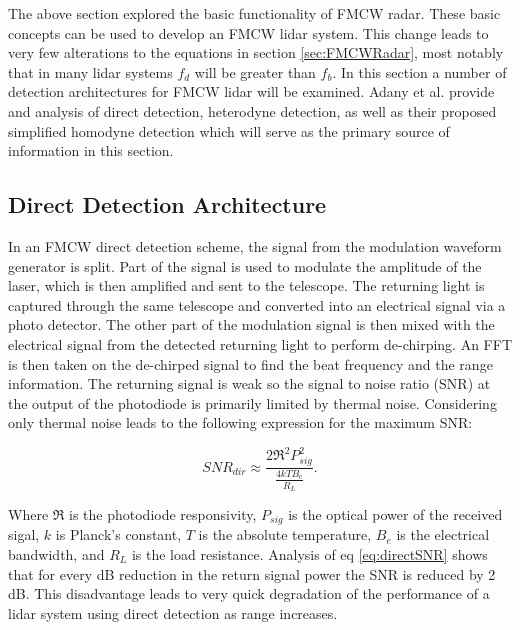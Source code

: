 The above section explored the basic functionality of FMCW radar. These basic concepts can be used
to develop an FMCW lidar system. This change leads to very few alterations to the equations in section
\ref{sec:FMCWRadar}, most notably that in many lidar systems $f_d$ will be greater than $f_b$. 
In this section a number of detection architectures for FMCW lidar will be examined. Adany et al. provide
and analysis of direct detection, heterodyne detection, as well as their proposed simplified homodyne 
detection \cite{adany09,adany2007simplified} which will serve as the primary source of information in this section. 

\subsection{Direct Detection Architecture}
In an FMCW direct detection scheme, the signal from the modulation waveform generator is split. Part of the signal
is used to modulate the amplitude of the laser, which is then amplified and sent to the telescope. The 
returning light is captured through the same telescope and converted into an electrical signal via a
photo detector. The other part of the modulation signal is then mixed with the electrical signal from the
detected returning light to perform de-chirping. An FFT is then taken on the de-chirped signal to find 
the beat frequency and the range information. The returning signal is weak so the signal to noise ratio (SNR)
at the output of the photodiode is primarily limited by thermal noise. Considering only thermal noise leads
to the following expression for the maximum SNR:

\begin{equation}
\label{eq:directSNR}
SNR_{dir}\approx\frac{2\Re^2P_{sig}^2}{\frac{4kTB_e}{R_L}}. 
\end{equation}
  
Where $\Re$ is the photodiode responsivity, $P_{sig}$ is the optical power of the received sigal, $k$ is Planck's
constant, $T$ is the absolute temperature, $B_e$ is the electrical bandwidth, and $R_L$ is the load resistance.
Analysis of eq \ref{eq:directSNR} shows that for every dB reduction in the return signal power the SNR is reduced
by 2 dB. This disadvantage leads to very quick degradation of the performance of a lidar system using direct detection
as range increases. 

